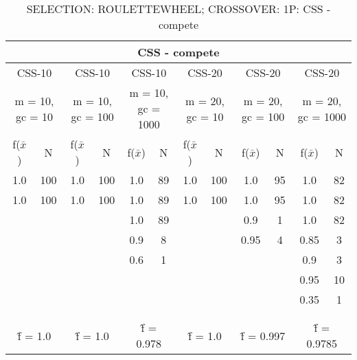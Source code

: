 \begin{table}[H]
	\centering
	\caption{SELECTION: ROULETTEWHEEL; CROSSOVER: 1P: CSS - compete}
	\begin{adjustbox}{width=1\textwidth}
		\begin{tabular}{ |c|c||c|c||c|c||c|c||c|c||c|c| }
			\hline
			\multicolumn{12}{|c|}{CSS - compete} \\
			\hline
			\multicolumn{2}{|c||}{CSS-10} & \multicolumn{2}{c||}{CSS-10} & \multicolumn{2}{c||}{CSS-10} & \multicolumn{2}{c||}{CSS-20} & \multicolumn{2}{c||}{CSS-20} & \multicolumn{2}{c|}{CSS-20}\\
			\hline
			\multicolumn{2}{|c||}{m = 10, gc = 10} & \multicolumn{2}{c||}{m = 10, gc = 100} & \multicolumn{2}{c||}{m = 10, gc = 1000} & \multicolumn{2}{c||}{m = 20, gc = 10} & \multicolumn{2}{c||}{m = 20, gc = 100} & \multicolumn{2}{c|}{m = 20, gc = 1000}\\
			\hline
			f($\bar{x}$) & N & f($\bar{x}$) & N & f($\bar{x}$) & N & f($\bar{x}$) & N & f($\bar{x}$) & N & f($\bar{x}$) & N\\
			\hline
			\hline
			1.0 & 100 & 1.0 & 100 & 1.0 & 89 & 1.0 & 100 & 1.0 & 95 & 1.0 & 82\\
			\hline
			1.0 & 100 & 1.0 & 100 & 1.0 & 89 & 1.0 & 100 & 1.0 & 95 & 1.0 & 82\\
			&   &   &   & 1.0 & 89 &   &   & 0.9 & 1 & 1.0 & 82\\
			&   &   &   & 0.9 & 8 &   &   & 0.95 & 4 & 0.85 & 3\\
			&   &   &   & 0.6 & 1 &   &   &   &   & 0.9 & 3\\
			&   &   &   &   &   &   &   &   &   & 0.95 & 10\\
			&   &   &   &   &   &   &   &   &   & 0.35 & 1\\
			&   &   &   &   &   &   &   &   &   &   &  \\
			&   &   &   &   &   &   &   &   &   &   &  \\
			\hline
			\multicolumn{2}{|c||}{\^{f} = 1.0} & \multicolumn{2}{c||}{\^{f} = 1.0} & \multicolumn{2}{c||}{\^{f} = 0.978} & \multicolumn{2}{c||}{\^{f} = 1.0} & \multicolumn{2}{c||}{\^{f} = 0.997} & \multicolumn{2}{c|}{\^{f} = 0.9785}\\
			\hline
		\end{tabular}
	\end{adjustbox}
\end{table}
